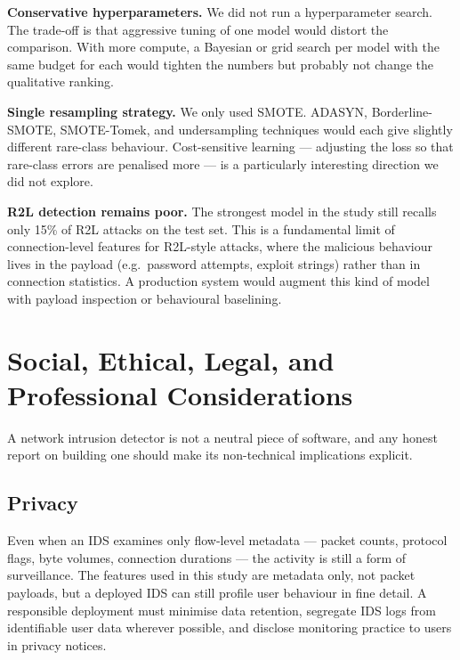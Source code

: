 \documentclass[11pt, a4paper]{article}
\begin{document}
\textbf{Conservative hyperparameters.} We did not run a hyperparameter search. The trade-off is that aggressive tuning of one model would distort the comparison. With more compute, a Bayesian or grid search per model with the same budget for each would tighten the numbers but probably not change the qualitative ranking.

\textbf{Single resampling strategy.} We only used SMOTE. ADASYN, Borderline-SMOTE, SMOTE-Tomek, and undersampling techniques would each give slightly different rare-class behaviour. Cost-sensitive learning --- adjusting the loss so that rare-class errors are penalised more --- is a particularly interesting direction we did not explore.

\textbf{R2L detection remains poor.} The strongest model in the study still recalls only 15\% of R2L attacks on the test set. This is a fundamental limit of connection-level features for R2L-style attacks, where the malicious behaviour lives in the payload (e.g.\ password attempts, exploit strings) rather than in connection statistics. A production system would augment this kind of model with payload inspection or behavioural baselining.

\section{Social, Ethical, Legal, and Professional Considerations}
\label{sec:ethics}

A network intrusion detector is not a neutral piece of software, and any honest report on building one should make its non-technical implications explicit.

\subsection{Privacy}
Even when an IDS examines only flow-level metadata --- packet counts, protocol flags, byte volumes, connection durations --- the activity is still a form of surveillance. The features used in this study are metadata only, not packet payloads, but a deployed IDS can still profile user behaviour in fine detail. A responsible deployment must minimise data retention, segregate IDS logs from identifiable user data wherever possible, and disclose monitoring practice to users in privacy notices.
\end{document}
